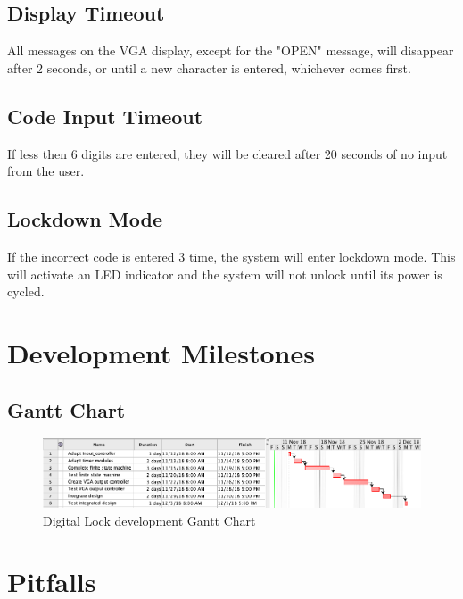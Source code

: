 \documentclass[11pt]{article}
\begin{document}
\subsection{Display Timeout}

All messages on the VGA display, except for the "OPEN" message, will disappear after 2 seconds, or until a new character is entered, whichever comes first.

\subsection{Code Input Timeout}

If less then 6 digits are entered, they will be cleared after 20 seconds of no input from the user.

\subsection{Lockdown Mode}

If the incorrect code is entered 3 time, the system will enter lockdown mode. This will activate an LED indicator and the system will not unlock until its power is cycled.

\section{Development Milestones}

\subsection{Gantt Chart}

\begin{figure}[H]
\begin{center}
	\includegraphics[width = \textwidth]{../docs/images/Timeline.png}
	\caption{\label{fig:gantt} Digital Lock development Gantt Chart}
\end{center}
\end{figure}

\section{Pitfalls}
\end{document}
